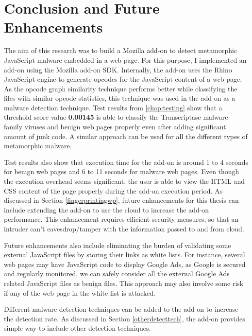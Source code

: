 \chapter{Conclusion and Future Enhancements}

The aim of this research was to build a Mozilla add-on to detect metamorphic JavaScript malware embedded in a web page. For this purpose, I implemented an add-on using the Mozilla add-on SDK. Internally, the add-on uses the Rhino JavaScript engine to generate opcodes for the JavaScript content of a web page. As the opcode graph similarity technique performs better while classifying the files with similar opcode statistics, this technique was used in the add-on as a malware detection technique. Test results from \autoref{chap:testing} show that a threshold score value \textbf{0.00145} is able to classify the Transcriptase malware family viruses and benign web pages properly even after adding significant amount of junk code. A similar approach can be used for all the different types of metamorphic malware.

Test results also show that execution time for the add-on is around 1 to 4 seconds for benign web pages and 6 to 11 seconds for malware web pages. Even though the execution overhead seems significant, the user is able to view the HTML and CSS content of the page properly during the add-on execution period. As discussed in Section \ref{fingerprintingwp}, future enhancements for this thesis can include extending the add-on to use the cloud to increase the add-on performance. This enhancement requires efficient security measures, so that an intruder can't eavesdrop/tamper with the information passed to and from cloud. 

Future enhancements also include eliminating the burden of validating some external JavaScript files by storing their links as white lists. For instance, several web pages may have JavaScript code to display Google Ads, as Google is secured and regularly monitored, we can safely consider all the external Google Ads related JavaScript files as benign files. This approach may also involve some risk if any of the web page in the white list is attacked.

Different malware detection techniques can be added to the add-on to increase the detection rate. As discussed in Section \ref{otherdetecttech}, the add-on provides simple way to include other detection techniques.
